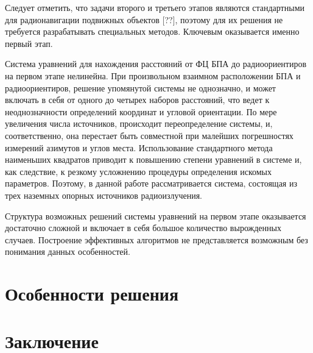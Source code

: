 \documentclass[a4paper,12pt]{article}
\begin{document}
Следует отметить, что задачи второго и третьего этапов являются стандартными для радионавигации подвижных объектов [??],
поэтому для их решения не требуется разрабатывать специальных методов. Ключевым оказывается именно первый этап.

Система уравнений для нахождения расстояний от ФЦ БПА до радиоориентиров на первом этапе нелинейна. При произвольном взаимном
расположении БПА и радиоориентиров, решение упомянутой системы не однозначно, и может включать в себя от одного
до четырех наборов расстояний, что ведет к неоднозначности определений координат и угловой ориентации. По мере увеличения
числа источников, происходит переопределение системы, и, соответственно, она перестает быть совместной при малейших
погрешностях измерений азимутов и углов места. Использование стандартного метода наименьших квадратов приводит к повышению
степени уравнений в системе и, как следствие, к резкому усложнению процедуры определения искомых параметров. Поэтому, в данной
работе рассматривается система, состоящая из трех наземных опорных источников радиоизлучения.

Структура возможных решений системы уравнений на первом этапе оказывается достаточно сложной и включает в себя большое
количество вырожденных случаев. Построение эффективных алгоритмов не представляется возможным без понимания данных
особенностей.

\section{Особенности решения}

\section{Заключение}
\end{document}
